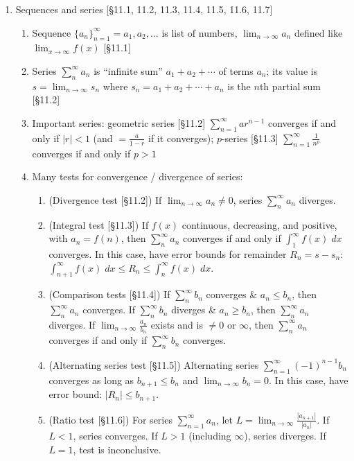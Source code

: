 \documentclass[11pt]{article}
\begin{document}
\begin{enumerate}
\item Sequences and series [\S11.1, 11.2, 11.3, 11.4, 11.5, 11.6, 11.7]
\begin{enumerate}
\item Sequence $\{a_n\}_{n=1}^{\infty} = a_1,a_2,\ldots$ is list of numbers, $\displaystyle \lim_{n\to \infty} a_n$ defined like $\displaystyle \lim_{x \to \infty} f(x)$ [\S11.1]
\item Series $\sum_{n}^{\infty} a_n$ is ``infinite sum'' $a_1+a_2+\cdots$ of terms $a_n$; its value is $s=\lim_{n\to\infty} s_n$ where $s_n = a_1+a_2+\cdots+a_n$ is the $n$th partial sum [\S11.2]
\item Important series: geometric series [\S11.2] $\sum_{n=1}^{\infty} ar^{n-1}$ converges if and only if $|r|<1$ (and $=\frac{a}{1-r}$ if it converges); $p$-series [\S11.3] $\sum_{n=1}^{\infty}\frac{1}{n^p}$ converges if and only if $p > 1$ 
\item Many tests for convergence / divergence of series:
\begin{enumerate}
\item (Divergence test [\S11.2]) If $\lim_{n\to \infty} a_n \neq 0$, series $\sum_{n}^{\infty} a_n$ diverges.
\item (Integral test [\S11.3]) If $f(x)$ continuous, decreasing, and positive, with $a_n = f(n)$, then $\sum_{n}^{\infty} a_n$ converges if and only if $\int_{1}^{\infty} f(x) \; dx$ converges. In this case, have error bounds for remainder $R_n = s-s_n$: $\int_{n+1}^{\infty} f(x) \; dx \leq R_n \leq \int_{n}^{\infty} f(x) \; dx$.
\item (Comparison tests [\S11.4]) If $\sum_{n}^{\infty} b_n$ converges \& $a_n \leq b_n$, then $\sum_{n}^{\infty} a_n$ converges. If $\sum_{n}^{\infty} b_n$ diverges \& $a_n \geq b_n$, then $\sum_{n}^{\infty} a_n$ diverges. If $\lim_{n\to\infty} \frac{a_n}{b_n}$ exists and is $\neq 0$ or $\infty$, then $\sum_{n}^{\infty} a_n$ converges if and only if $\sum_{n}^{\infty} b_n$ converges.
\item (Alternating series test [\S11.5]) Alternating series $\sum_{n=1}^{\infty} (-1)^{n-1} b_n$ converges as long as $b_{n+1} \leq b_n$ and $\lim_{n\to\infty} b_n=0$. In this case, have error bound: $|R_n| \leq b_{n+1}$.
\item (Ratio test [\S11.6]) For series $\sum_{n=1}^{\infty} a_n$, let $L = \lim_{n\to \infty} \frac{|a_{n+1}|}{|a_n|}$. If $L < 1$, series converges. If $L > 1$ (including $\infty$), series diverges. If $L=1$, test is inconclusive.
\end{enumerate}
\end{enumerate}


\end{enumerate}
\end{document}

